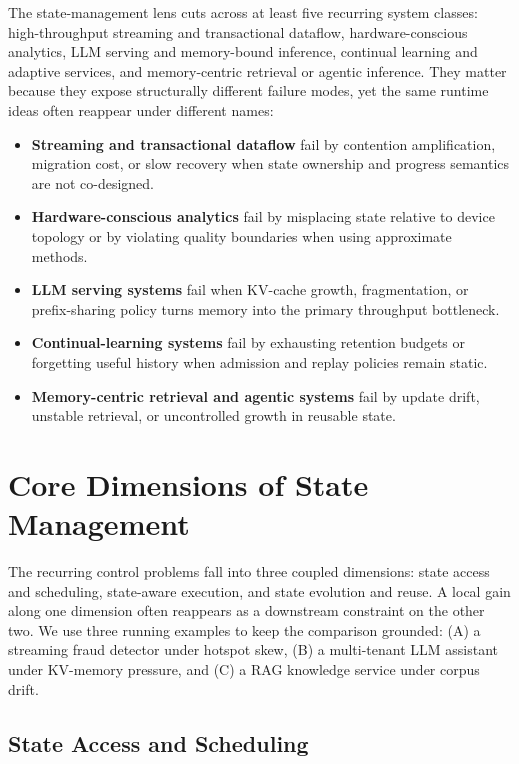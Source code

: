 ﻿\documentclass[manuscript]{acmart}
\begin{document}
The state-management lens cuts across at least five recurring system classes: high-throughput streaming and transactional dataflow, hardware-conscious analytics, LLM serving and memory-bound inference, continual learning and adaptive services, and memory-centric retrieval or agentic inference. They matter because they expose structurally different failure modes, yet the same runtime ideas often reappear under different names:
\begin{itemize}[leftmargin=*]
\item \textbf{Streaming and transactional dataflow} fail by contention amplification, migration cost, or slow recovery when state ownership and progress semantics are not co-designed.
\item \textbf{Hardware-conscious analytics} fail by misplacing state relative to device topology or by violating quality boundaries when using approximate methods.
\item \textbf{LLM serving systems} fail when KV-cache growth, fragmentation, or prefix-sharing policy turns memory into the primary throughput bottleneck.
\item \textbf{Continual-learning systems} fail by exhausting retention budgets or forgetting useful history when admission and replay policies remain static.
\item \textbf{Memory-centric retrieval and agentic systems} fail by update drift, unstable retrieval, or uncontrolled growth in reusable state.
\end{itemize}

\section{Core Dimensions of State Management}
\label{sec:core-dimensions}

The recurring control problems fall into three coupled dimensions: state access and scheduling, state-aware execution, and state evolution and reuse. A local gain along one dimension often reappears as a downstream constraint on the other two. We use three running examples to keep the comparison grounded: (A) a streaming fraud detector under hotspot skew, (B) a multi-tenant LLM assistant under KV-memory pressure, and (C) a RAG knowledge service under corpus drift.

\subsection{State Access and Scheduling}
\end{document}

